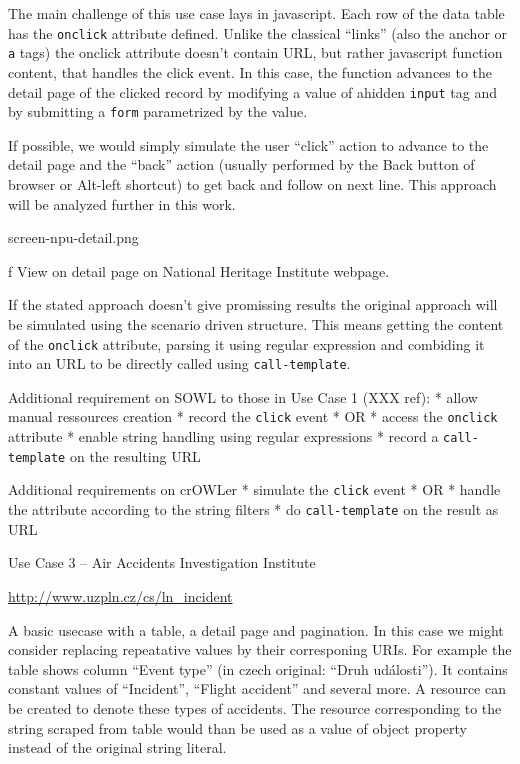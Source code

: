 The main challenge of this use case lays in javascript. Each row of the data
table has the {\tt onclick} attribute defined. Unlike the classical ``links''
(also the anchor or {\tt a} tags) the onclick attribute doesn't contain URL,
but rather javascript function content, that handles the click event. In this
case, the function advances to the detail page of the clicked record by
modifying a value of ahidden {\tt input} tag and by submitting a {\tt form}
parametrized by the value. 

If possible, we would simply simulate the user ``click'' action to advance to
the detail page and the ``back'' action (usually performed by the Back button
of browser or Alt-left shortcut) to get back and follow on next line. This
approach will be analyzed further in this work.

\midinsert
\picw=12cm \cinspic screen-npu-detail.png
\caption/f View on detail page on National Heritage Institute webpage. 
\endinsert

If the stated approach doesn't give promissing results the original approach
will be simulated using the scenario driven structure. This means getting the
content of the {\tt onclick} attribute, parsing it using regular expression and
combiding it into an URL to be directly called using {\tt call-template}. 

Additional requirement on SOWL to those in Use Case 1 (XXX ref): 
\begitems
  * allow manual ressources creation
  * record the {\tt click} event 
  * OR
  * access the {\tt onclick} attribute
  * enable string handling using regular expressions
  * record a {\tt call-template} on the resulting URL 
\enditems

Additional requirements on crOWLer
\begitems
  * simulate the {\tt click} event
  * OR
  * handle the attribute according to the string filters
  * do {\tt call-template} on the result as URL
\enditems


\secc Use Case 3 -- Air Accidents Investigation Institute

\url{http://www.uzpln.cz/cs/ln_incident}

A basic usecase with a table, a detail page and pagination. In this case we
might consider replacing repeatative values by their corresponing URIs. For
example the table shows column ``Event type'' (in czech original: ``Druh
události''). It contains constant values of ``Incident'', ``Flight accident''
and several more. A resource can be created to denote these types of accidents.
The resource corresponding to the string scraped from table would than be used
as a value of object property instead of the original string literal. 

